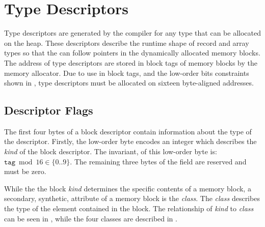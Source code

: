 \section{Type Descriptors}\label{memlay:type-descriptors}

Type descriptors are generated by the compiler for any type that can
be allocated on the heap.  These descriptors describe the runtime
shape of record and array types so that the \gc can follow pointers in
the dynamically allocated memory blocks.  The address of type
descriptors are stored in block tags of memory blocks by the memory
allocator.  Due to use in block tags, and the low-order bits
constraints shown in , type
descriptors must be allocated on sixteen byte-aligned addresses.

\subsection{Descriptor Flags}\label{memlay:descriptor-flags}
The first four bytes of a block descriptor contain information about
the type of the descriptor.  Firstly, the low-order byte encodes an
integer which describes the \emph{kind} of the block descriptor.  The
invariant, of this low-order byte is: $\texttt{tag} \bmod 16 \in
\{0..9\}$.  The remaining three bytes of the field are reserved and
must be zero.

While the the block \emph{kind} determines the specific contents of a
memory block, a secondary, synthetic, attribute of a memory block is
the \emph{class}.  The \emph{class} describes the type of the element
contained in the block.  The relationship of \emph{kind} to
\emph{class} can be seen in , while the
four classes are described in .

